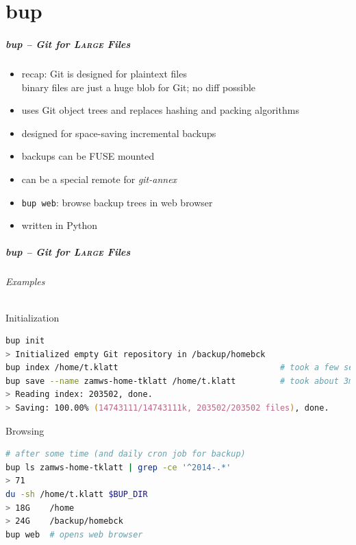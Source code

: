 \documentclass[english,hyperref={pdfpagelabels=false},aspectratio=169]{beamer}
\begin{document}
\part{bup}
\makepart

\begin{frame}[label=bup]
  \frametitle{bup -- Git for \textsc{Large} Files}
  \begin{itemize}
    \item recap: Git is designed for plaintext files\\
      {\scriptsize binary files are just a huge blob for Git; no diff possible}
    \item uses Git object trees and replaces hashing and packing algorithms
    \item designed for space-saving incremental backups
    \item backups can be FUSE mounted
    \item can be a special remote for \textit{git-annex}
    \item \texttt{bup web}: browse backup trees in web browser
    \item written in Python
  \end{itemize}
\end{frame}

\begin{frame}[fragile]
  \frametitle{bup -- Git for \textsc{Large} Files}
  \framesubtitle{Examples}
  \begin{block}{Initialization}
    \vspace{-0.75em}
    \begin{lstlisting}[language=zsh]
bup init
> Initialized empty Git repository in /backup/homebck
bup index /home/t.klatt                                 # took a few seconds
bup save --name zamws-home-tklatt /home/t.klatt         # took about 3min
> Reading index: 203502, done.
> Saving: 100.00% (14743111/14743111k, 203502/203502 files), done.
    \end{lstlisting}
    \vspace{-0.75em}
  \end{block}
  \begin{block}{Browsing}
    \vspace{-0.75em}
    \begin{lstlisting}[language=zsh]
# after some time (and daily cron job for backup)
bup ls zamws-home-tklatt | grep -ce '^2014-.*'
> 71
du -sh /home/t.klatt $BUP_DIR
> 18G    /home
> 24G    /backup/homebck
bup web  # opens web browser
    \end{lstlisting}
    \vspace{-0.75em}
  \end{block}
\end{frame}
\end{document}
